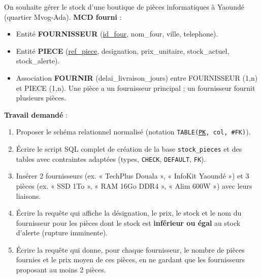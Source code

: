 \documentclass[11pt]{article}
\begin{document}
\begin{exercice}
On souhaite gérer le stock d'une boutique de pièces informatiques à Yaoundé (quartier Mvog-Ada).
\textbf{MCD fourni} :
\begin{itemize}
\item Entité \textbf{FOURNISSEUR} (\underline{id\_four}, nom\_four, ville, telephone).
\item Entité \textbf{PIECE} (\underline{ref\_piece}, designation, prix\_unitaire, stock\_actuel, stock\_alerte).
\item Association \textbf{FOURNIR} (delai\_livraison\_jours) entre FOURNISSEUR (1,n) et PIECE (1,n). Une pièce a un fournisseur principal ; un fournisseur fournit plusieurs pièces.
\end{itemize}
\textbf{Travail demandé} :
\begin{enumerate}
\item Proposer le schéma relationnel normalisé (notation \texttt{TABLE(\underline{PK}, col, \#FK)}).
\item Écrire le script SQL complet de création de la base \texttt{stock\_pieces} et des tables avec contraintes adaptées (types, \texttt{CHECK}, \texttt{DEFAULT}, \texttt{FK}).
\item Insérer 2 fournisseurs (ex. « TechPlus Douala », « InfoKit Yaoundé ») et 3 pièces (ex. « SSD 1To », « RAM 16Go DDR4 », « Alim 600W ») avec leurs liaisons.
\item Écrire la requête qui affiche la désignation, le prix, le stock et le nom du fournisseur pour les pièces dont le stock est \textbf{inférieur ou égal} au stock d'alerte (rupture imminente).
\item Écrire la requête qui donne, pour chaque fournisseur, le nombre de pièces fournies et le prix moyen de ces pièces, en ne gardant que les fournisseurs proposant au moins 2 pièces.
\end{enumerate}
\end{exercice}
\end{document}
